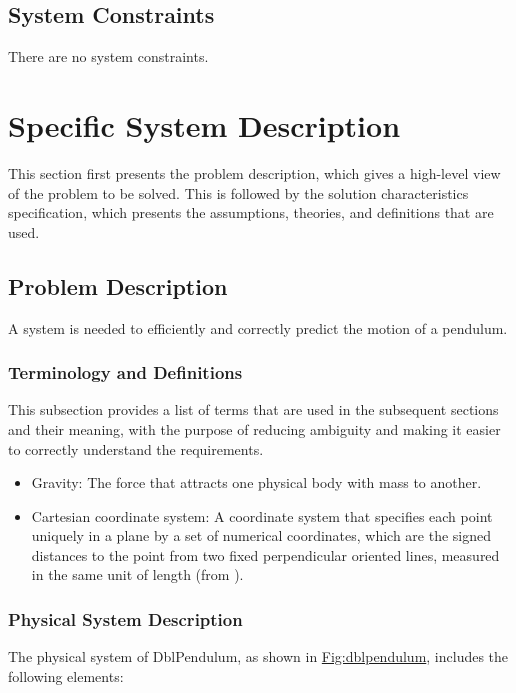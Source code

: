 \documentclass[12pt]{article}
\begin{document}
\subsection{System Constraints}
\label{Sec:SysConstraints}
There are no system constraints.

\section{Specific System Description}
\label{Sec:SpecSystDesc}
This section first presents the problem description, which gives a high-level view of the problem to be solved. This is followed by the solution characteristics specification, which presents the assumptions, theories, and definitions that are used.

\subsection{Problem Description}
\label{Sec:ProbDesc}
A system is needed to efficiently and correctly predict the motion of a pendulum.

\subsubsection{Terminology and Definitions}
\label{Sec:TermDefs}
This subsection provides a list of terms that are used in the subsequent sections and their meaning, with the purpose of reducing ambiguity and making it easier to correctly understand the requirements.

\begin{itemize}
\item{Gravity: The force that attracts one physical body with mass to another.}
\item{Cartesian coordinate system: A coordinate system that specifies each point uniquely in a plane by a set of numerical coordinates, which are the signed distances to the point from two fixed perpendicular oriented lines, measured in the same unit of length (from \cite{cartesianWiki}).}
\end{itemize}
\subsubsection{Physical System Description}
\label{Sec:PhysSyst}
The physical system of DblPendulum, as shown in \hyperref[Figure:dblpendulum]{Fig:dblpendulum}, includes the following elements:
\end{document}
